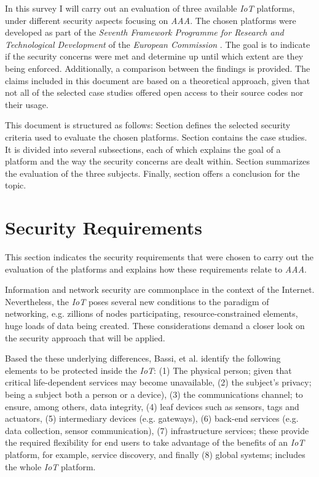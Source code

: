 \documentclass[journal]{IEEEtran}
\begin{document}
  In this survey I will carry out an evaluation of three available \emph{IoT} platforms, under different security aspects focusing on \emph{AAA}. The chosen platforms were developed as part of the \emph{Seventh Framework Programme for Research and Technological Development} of the \emph{European Commission} \cite{FP7}. The goal is to indicate if the security concerns were met and determine up until which extent are they being enforced. Additionally, a comparison between the findings is provided. The claims included in this document are based on a theoretical approach, given that not all of the selected case studies offered open access to their source codes nor their usage.

  This document is structured as follows: Section \uppercase\expandafter{} defines the selected security criteria used to evaluate the chosen platforms. Section \uppercase\expandafter{} contains the case studies. It is divided into several subsections, each of which explains the goal of a platform and the way the security concerns are dealt within. Section \uppercase\expandafter{} summarizes the evaluation of the three subjects. Finally, section \uppercase\expandafter{} offers a conclusion for the topic.

\section{Security Requirements} \label{sec_security_requirements}
  This section indicates the security requirements that were chosen to carry out the evaluation of the platforms and explains how these requirements relate to \emph{AAA}.

  Information and network security are commonplace in the context of the Internet. Nevertheless, the \emph{IoT} poses several new conditions to the paradigm of networking, e.g. zillions of nodes participating, resource-constrained elements, huge loads of data being created. These considerations demand a closer look on the security approach that will be applied.

  Based the these underlying differences, Bassi, et al. \cite{Bassi2013} identify the following elements to be protected inside the \emph{IoT}: (1) The physical person; given that critical life-dependent services may become unavailable, (2) the subject's privacy; being a subject both a person or a device), (3) the communications channel; to ensure, among others, data integrity, (4) leaf devices such as sensors, tags and actuators, (5) intermediary devices (e.g. gateways), (6) back-end services (e.g. data collection, sensor communication), (7) infrastructure services; these provide the required flexibility for end users to take advantage of the benefits of an \emph{IoT} platform, for example, service discovery, and finally (8) global systems; includes the whole \emph{IoT} platform.
\end{document}
